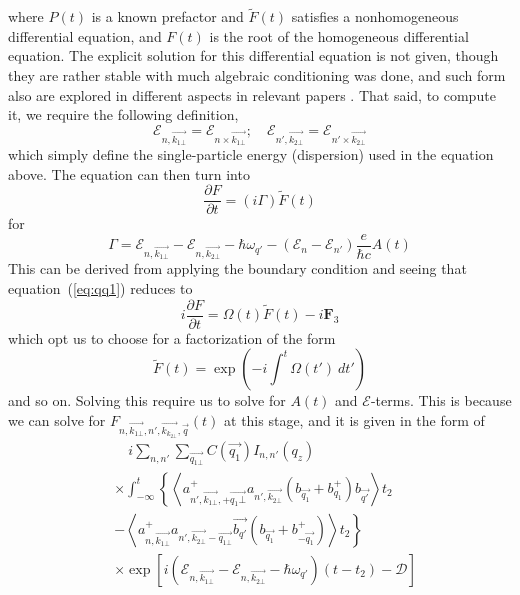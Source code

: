 \documentclass[%
 reprint,
 amsmath,amssymb,
 aps,
]{revtex4-2}
\begin{document}
where $P(t)$ is a known prefactor and $\tilde{F}(t)$ satisfies a nonhomogeneous differential equation, and $F(t)$ is the root of the homogeneous differential equation. The explicit solution for this differential equation is not given, though they are rather stable with much algebraic conditioning was done, and such form also are explored in different aspects in relevant papers \cite{houtput2025firstprinciplestheorynonlinearlongrange,griffin2025phononmediatedrelaxationnanomaterialscombining,PhysRevB.78.035417}. That said, to compute it, we require the following definition,
\begin{equation}
    \mathcal{E}_{n,\vec{k_{1\bot}}} = \mathcal{E}_{n\times\vec{k_{1\bot}}}; \quad \mathcal{E}_{n',\vec{k_{2\bot}}}=\mathcal{E}_{n'\times\vec{k_{2\bot}}}
\end{equation}
which simply define the single-particle energy (dispersion) used in the equation above. The equation can then turn into
\begin{equation}
    \dfrac{\partial F}{\partial t} = (i \Gamma )\tilde{F}(t)
\end{equation}
for
\begin{equation}
    \Gamma = \mathcal{E}_{n,\vec{k_{1\bot}}}- \mathcal{E}_{n,\vec{k_{2\bot}}}-\hbar\omega_{q'} - \left(\mathcal{E}_n -\mathcal{E}_{n'}\right)\dfrac{e}{\hbar c}A(t)
\end{equation}
This can be derived from applying the boundary condition and seeing that equation~(\ref{eq:qq1}) reduces to
\begin{equation}
    i \frac{\partial F}{\partial t} = \Omega(t)\tilde{F}(t) - i\mathbf{F}_{3}
\end{equation}
which opt us to choose for a factorization of the form
\begin{equation}
    \tilde{F}(t) = \exp{\left(-i\int^{t}\Omega(t')\: dt'\right)}
\end{equation}
and so on. Solving this require us to solve for $A(t)$ and $\mathcal{E}$-terms. This is because we can solve for $ F_{n,\vec{k_{1\bot}},n',\vec{k_{k_{2\bot}}},\vec{q}}(t)$ at this stage, and it is given in the form of
\begin{equation}
    \begin{split}
        & \quad i \sum_{n,n'}\sum_{\vec{q_{1\bot}}} C \left(\vec{q_1}\right)I_{n,n'}(q_z) \\
        & \times \int^t_{-\infty} \left\{ \left \langle a^+_{n', \vec{k_{1\bot}},+\vec{q_1\bot}}a_{n',\vec{k_{2\bot}}}\left(b_{\vec{q_1}}+ b^+_{q_1}\right) b_{\vec{q'}} \right \rangle t_2\right. \\
        & - \left. \left\langle a^+_{n,\vec{k_{1\bot}}}a_{n',\vec{k_{2\bot}}-\vec{q_{1\bot}}}\vec{b_{q'}}\left(b_{\vec{q_{1}}}+b^+_{-\vec{q_1}}\right)\right\rangle t_2\right\} \\
        &\times\exp \left[i \left(\mathcal{E}_{n,\vec{k_{1\bot}}}- \mathcal{E}_{n,\vec{k_{2\bot}}}-\hbar\omega_{q'}\right) (t-t_2)- \mathcal{D}\right]
    \end{split}
\end{equation}
\end{document}
